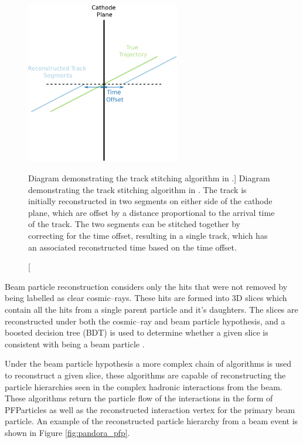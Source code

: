 \begin{figure}
	\centering
	\includegraphics[width=0.6\textwidth]{figures/track_stitch.pdf}
	\caption
	[Diagram demonstrating the track stitching algorithm in \protodune{}.]
	{Diagram demonstrating the track stitching algorithm in \protodune{}. The
	track is initially reconstructed in two segments on either side of the cathode
	plane, which are offset by a distance proportional to the arrival time of the
	track. The two segments can be stitched together by correcting for the time
	offset, resulting in a single track, which has an associated reconstructed
	time based on the time offset.}
	\label{fig:track_stitching}
\end{figure}

Beam particle reconstruction considers only the hits that were not removed by 
being labelled as clear cosmic--rays. These hits are formed into 3D slices which
contain all the hits from a single parent particle and it's daughters. The
slices are reconstructed under both the cosmic--ray and beam particle
hypothesis, and a boosted decision tree (BDT) is used to determine whether a 
given slice is consistent with being a beam particle . 

Under the beam particle hypothesis a more complex chain of algorithms is used to
reconstruct a given slice, these algorithms are capable of reconstructing the
particle hierarchies seen in the complex hadronic interactions from the
\protodune{} beam. These algorithms return the particle flow of the interactions
in the form of PFParticles as well as the reconstructed interaction vertex for
the primary beam particle. An example of the reconstructed particle hierarchy
from a \protodune{} beam event is shown in Figure \ref{fig:pandora_pfp}.

